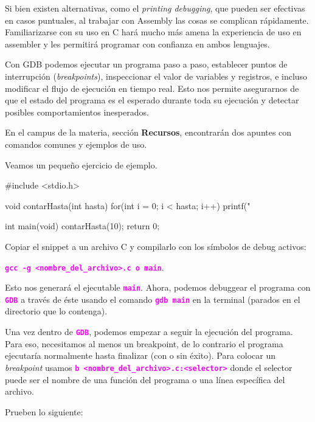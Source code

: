 \documentclass[]{scrartcl}
\newcommand{\hl}[1]{\textcolor{magenta}{\textbf{\texttt{#1}}}}
\begin{document}
Si bien existen alternativas, como el \textit{printing debugging}, que pueden ser efectivas en casos puntuales, al trabajar con Assembly las cosas se complican rápidamente.
Familiarizarse con su uso en C hará mucho más amena la experiencia de uso en assembler y les permitirá programar con confianza en ambos lenguajes.

Con GDB podemos ejecutar un programa paso a paso, establecer puntos de interrupción (\textit{breakpoints}), inspeccionar el valor de variables y registros, e incluso modificar el flujo de ejecución en tiempo real.
Esto nos permite asegurarnos de que el estado del programa es el esperado durante toda su ejecución y detectar posibles comportamientos inesperados.

En el campus de la materia, sección \textbf{Recursos}, encontrarán dos apuntes con comandos comunes y ejemplos de uso.

Veamos un pequeño ejercicio de ejemplo.

\begin{cbox}[unbreakable]{}
#include <stdio.h>

void contarHasta(int hasta){
  for(int i = 0; i < hasta; i++){
    printf("%
  }
}

int main(void){
  contarHasta(10);
  return 0;
}
\end{cbox}

Copiar el snippet a un archivo C y compilarlo con los símbolos de debug activos: 

\hl{gcc -g <nombre\_del\_archivo>.c \-o main}.

Esto nos generará el ejecutable \hl{main}.
Ahora, podemos debuggear el programa con \hl{GDB} a través de éste usando el comando \hl{gdb main} en la terminal (parados en el directorio que lo contenga).

Una vez dentro de \hl{GDB}, podemos empezar a seguir la ejecución del programa. Para eso, necesitamos al menos un breakpoint, de lo contrario el programa ejecutaría normalmente hasta finalizar (con o sin éxito). 
Para colocar un \textit{breakpoint} usamos \hl{b <nombre\_del\_archivo>.c:<selector>} donde el selector puede ser el nombre de una función del programa o una línea específica del archivo.

Prueben lo siguiente:
\end{document}
